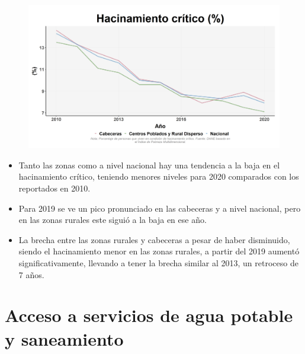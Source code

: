     \begin{figure}[H]
        \caption[Hacinamiento por zonas y nacional ]{\label{hacinamiento_zonas} }
        \begin{center}
        \includegraphics[width=\textwidth,keepaspectratio]{img/var_267_trend.png}
        \end{center}
    \end{figure}
            \begin{itemize}
                    \item Tanto las zonas como a nivel nacional hay una tendencia a la baja en el hacinamiento crítico, teniendo menores niveles para 2020 comparados con los reportados en 2010.
                    \item Para 2019 se ve un pico pronunciado en las cabeceras y a nivel nacional, pero en las zonas rurales este siguió a la baja en ese año.
                    \item La brecha entre las zonas rurales y cabeceras a pesar de haber disminuido, siendo el hacinamiento menor en las zonas rurales, a partir del 2019 aumentó significativamente, llevando a tener la brecha similar al 2013, un retroceso de 7 años.
                    \end{itemize}

\section{Acceso a servicios de agua potable y saneamiento}

